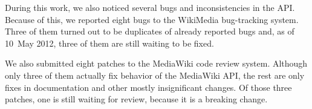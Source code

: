 During this work, we also noticed several bugs and inconsistencies in the API.
Because of this, we reported eight bugs to the WikiMedia bug-tracking system.
Three of them turned out to be duplicates of already reported bugs and,
as of 10~May 2012, three of them are still waiting to be fixed.

We also submitted eight patches to the MediaWiki code review system.
Although only three of them actually fix behavior of the MediaWiki API,
the rest are only fixes in documentation and other mostly insignificant changes.
Of those three patches, one is still waiting for review, because it is a breaking change.